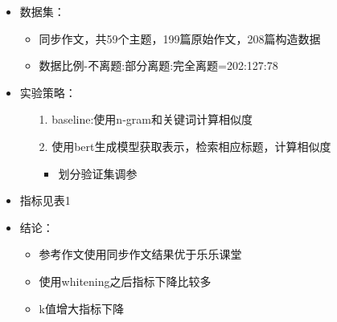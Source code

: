 \documentclass[11pt]{article}
\begin{document}
\begin{CJK}{UTF8}{gkai}
\begin{itemize}
  \item 数据集：
  \begin{itemize}
    \item 同步作文，共59个主题，199篇原始作文，208篇构造数据
    \item 数据比例-不离题:部分离题:完全离题=202:127:78
  \end{itemize}
  \item 实验策略：
  \begin{itemize}
    \item [1.] baseline:使用n-gram和关键词计算相似度
    \item [2.] 使用bert生成模型获取表示，检索相应标题，计算相似度
    \begin{itemize}
      \item 划分验证集调参
    \end{itemize}
  \end{itemize}
  \item 指标见表1
  \item 结论：
  \begin{itemize}
    \item 参考作文使用同步作文结果优于乐乐课堂
    \item 使用whitening之后指标下降比较多
    \item k值增大指标下降
  \end{itemize}
\end{itemize}


\end{CJK}
\end{document}

